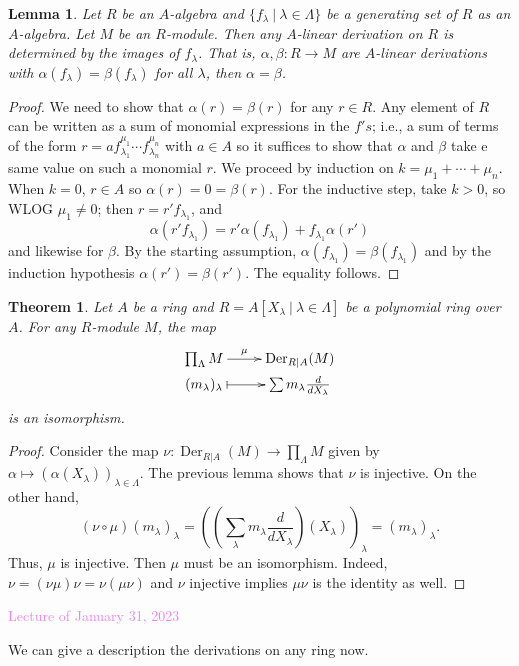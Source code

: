 \documentclass{amsart}[12pt]
\def\Der{\operatorname{Der}}
\newcommand{\Jan}[1]{\textcolor{violet}{Lecture of January #1, 2023}}
\numberwithin{equation}{section}
\theoremstyle{plain} %
\newtheorem{thm}[equation]{Theorem}
\newtheorem{lem}[equation]{Lemma}
\theoremstyle{definition}
\theoremstyle{remark}
\begin{document}
\begin{lem} Let $R$ be an $A$-algebra and $\{f_\lambda \ | \ \lambda\in \Lambda\}$ be a generating set of $R$ as an $A$-algebra. Let $M$ be an $R$-module.
Then any $A$-linear derivation on $R$ is determined by the images of $f_\lambda$. That is, $\alpha,\beta:R\to M$ are $A$-linear derivations with $\alpha(f_\lambda) = \beta(f_\lambda)$ for all $\lambda$, then $\alpha=\beta$.
\end{lem}
\begin{proof} We need to show that $\alpha(r)=\beta(r)$ for any $r\in R$. Any element of $R$ can be written as a sum of monomial expressions in the $f's$; i.e., a sum of terms of the form $r=a f_{\lambda_1}^{\mu_1}\cdots f_{\lambda_n}^{\mu_n}$ with $a\in A$ so it suffices to show that $\alpha$ and $\beta$ take e same value on such a monomial $r$. We proceed by induction on $k=\mu_1+\cdots + \mu_n$. When $k=0$, $r\in A$ so $\alpha(r)=0=\beta(r)$. For the inductive step, take $k>0$, so WLOG $\mu_1\neq 0$; then $r= r' f_{\lambda_1}$, and
\[ \alpha(r' f_{\lambda_1}) = r' \alpha(f_{\lambda_1}) + f_{\lambda_1} \alpha(r')\]
and likewise for $\beta$. By the starting assumption, $\alpha(f_{\lambda_1}) = \beta(f_{\lambda_1})$ and by the induction hypothesis $\alpha(r')=\beta(r')$. The equality follows.
\end{proof}

\begin{thm}
Let $A$ be a ring and $R=A[X_\lambda \ | \ \lambda\in\Lambda]$ be a polynomial ring over $A$. For any $R$-module $M$, the map
\[\xymatrix@R=0pc{ \prod_{\Lambda} M \ar[r]^-{\mu} & \Der_{R|A}(M) \\ 
(m_\lambda)_\lambda \ar@{|->}[r] &  \sum m_\lambda \frac{d}{dX_\lambda}
}\]
is an isomorphism.
\end{thm}
\begin{proof}
Consider the map $\nu:\Der_{R|A}(M) \to \prod_{\Lambda} M$ given by $\alpha\mapsto (\alpha(X_\lambda))_{\lambda\in \Lambda}$. The previous lemma shows that $\nu$ is injective. On the other hand, 
\[ (\nu \circ \mu)(m_\lambda)_\lambda = ( (\sum_\lambda m_\lambda \frac{d}{dX_\lambda})(X_\lambda) )_\lambda = (m_\lambda)_\lambda.\]
Thus, $\mu$ is injective. Then $\mu$ must be an isomorphism. Indeed, $\nu = (\nu  \mu) \nu = \nu (\mu \nu)$ and $\nu$ injective implies $\mu \nu$ is the identity as well.
\end{proof}

\Jan{31}

We can give a description the derivations on any ring now.
\end{document}
